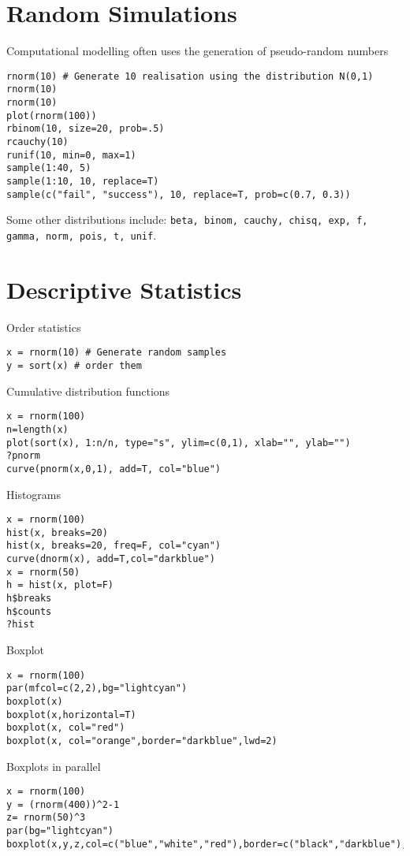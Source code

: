 \documentclass[a4paper,10pt]{article}
\begin{document}
\section{Random Simulations}
Computational modelling often uses the generation of pseudo-random numbers

\begin{lstlisting}
rnorm(10) # Generate 10 realisation using the distribution N(0,1)
rnorm(10)
rnorm(10)
plot(rnorm(100))
rbinom(10, size=20, prob=.5)
rcauchy(10)
runif(10, min=0, max=1)
sample(1:40, 5)
sample(1:10, 10, replace=T)
sample(c("fail", "success"), 10, replace=T, prob=c(0.7, 0.3))
\end{lstlisting}

Some other distributions include: \texttt{beta, binom, cauchy, chisq, exp, f, gamma, norm, pois, t, unif}. 

\section{Descriptive Statistics}\label{sec:desc}

Order statistics 
\begin{lstlisting} 
x = rnorm(10) # Generate random samples 
y = sort(x) # order them 
\end{lstlisting}

\noindent
Cumulative distribution functions 
\begin{lstlisting}
x = rnorm(100)
n=length(x)
plot(sort(x), 1:n/n, type="s", ylim=c(0,1), xlab="", ylab="")
?pnorm
curve(pnorm(x,0,1), add=T, col="blue")
\end{lstlisting}

\noindent
Histograms 
\begin{lstlisting}
x = rnorm(100)
hist(x, breaks=20)
hist(x, breaks=20, freq=F, col="cyan")
curve(dnorm(x), add=T,col="darkblue")
x = rnorm(50)
h = hist(x, plot=F)
h$breaks
h$counts
?hist
\end{lstlisting}
\noindent
Boxplot
\begin{lstlisting}
x = rnorm(100)
par(mfcol=c(2,2),bg="lightcyan")
boxplot(x)
boxplot(x,horizontal=T)
boxplot(x, col="red")
boxplot(x, col="orange",border="darkblue",lwd=2)
\end{lstlisting}

\noindent
Boxplots in parallel 
\begin{lstlisting}
x = rnorm(100)
y = (rnorm(400))^2-1
z= rnorm(50)^3
par(bg="lightcyan")
boxplot(x,y,z,col=c("blue","white","red"),border=c("black","darkblue"),lwd=1.5)
\end{lstlisting}
\end{document}
